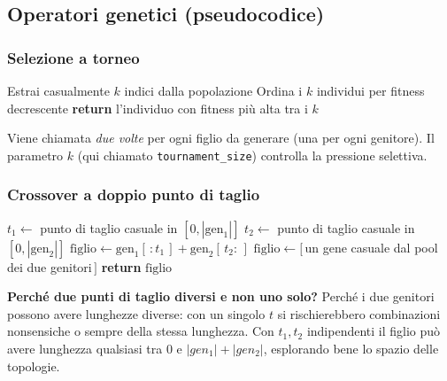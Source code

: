 \documentclass[11pt,a4paper]{article}
\newcommand{\fnt}{\texttt}     %
\begin{document}
\subsection{Operatori genetici (pseudocodice)}

\subsubsection{Selezione a torneo}

\begin{algorithm}[H]
\caption{\fnt{selezione\_torneo}(popolazione, fitness, $k$)}
\begin{algorithmic}[1]
\State Estrai casualmente $k$ indici dalla popolazione
\State Ordina i $k$ individui per fitness decrescente
\State \textbf{return} l'individuo con fitness più alta tra i $k$
\end{algorithmic}
\end{algorithm}

Viene chiamata \emph{due volte} per ogni figlio da generare (una per
ogni genitore). Il parametro $k$ (qui chiamato \texttt{tournament\_size})
controlla la pressione selettiva.

\subsubsection{Crossover a doppio punto di taglio}

\begin{algorithm}[H]
\caption{\fnt{crossover}(genitore$_1$, genitore$_2$)}
\begin{algorithmic}[1]
\State $t_1 \gets$ punto di taglio casuale in $[0, |\text{gen}_1|]$
\State $t_2 \gets$ punto di taglio casuale in $[0, |\text{gen}_2|]$
\State $\text{figlio} \gets \text{gen}_1[\,:t_1\,] + \text{gen}_2[\,t_2:\,]$
 
    \State $\text{figlio} \gets [\,$un gene casuale dal pool dei due genitori$\,]$
\EndIf
\State \textbf{return} $\text{figlio}$
\end{algorithmic}
\end{algorithm}

\textbf{Perché due punti di taglio diversi e non uno solo?} Perché i due
genitori possono avere lunghezze diverse: con un singolo $t$ si
rischierebbero combinazioni nonsensiche o sempre della stessa lunghezza.
Con $t_1, t_2$ indipendenti il figlio può avere lunghezza qualsiasi tra
$0$ e $|gen_1| + |gen_2|$, esplorando bene lo spazio delle topologie.
\end{document}
